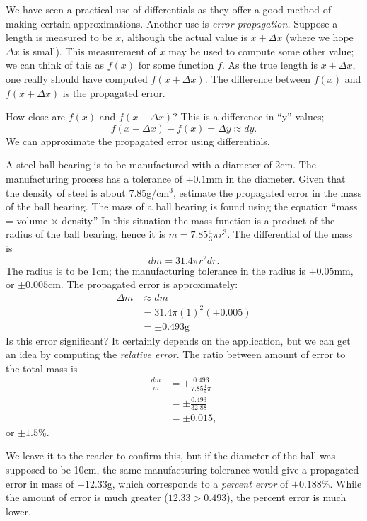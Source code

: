 We have seen a practical use of differentials as they offer a good method of making certain approximations. Another use is \textit{error propagation.} Suppose a length is measured to be $x$, although the actual value is $x+\Delta x$ (where we hope $\Delta x$ is small). This measurement of $x$ may be used to compute some other value; we can think of this as $f(x)$ for some function $f$. As the true length is $x+\Delta x$, one really should have computed $f(x+\Delta x)$. The difference between $f(x)$ and $f(x+\Delta x)$ is the propagated error. 

How close are $f(x)$ and $f(x+\Delta x)$? This is a difference in ``y'' values;
\[f(x+\Delta x)-f(x) = \Delta y \approx dy.\]
We can approximate the propagated error using differentials.

\begin{example}\label{ex_diffal4}
A steel ball bearing is to be manufactured with a diameter of 2cm. The manufacturing process has a tolerance of $\pm 0.1$mm in the diameter. Given that the density of steel is about 7.85g/cm$^3$, estimate the propagated error in the mass of the ball bearing.
\solution
The mass of a ball bearing is found using the equation ``mass = volume $\times$ density.'' In this situation the mass function is a product of the radius of the ball bearing, hence it is $m = 7.85\frac43\pi r^3$. The differential of the mass is
\[dm = 31.4\pi r^2 dr.\]
The radius is to be 1cm; the manufacturing tolerance in the radius is $\pm 0.05$mm, or $\pm 0.005$cm. The propagated error is approximately:
\begin{align*}
\Delta m & \approx dm \\
				&= 31.4\pi (1)^2 (\pm 0.005) \\
				&= \pm 0.493\text{g}
\end{align*}
Is this error significant? It certainly depends on the application, but we can get an idea by computing the \textit{relative error}. The ratio between amount of error to the total mass is
\begin{align*}
\frac{dm}{m} &= \pm \frac{0.493}{7.85\frac43\pi} \\
							&=\pm \frac{0.493}{32.88}\\
							&=\pm 0.015,
\end{align*}
or $\pm 1.5$\%. 

We leave it to the reader to confirm this, but if the diameter of the ball was supposed to be 10cm, the same manufacturing tolerance would give a propagated error in mass of $\pm12.33$g, which corresponds to a \textit{percent error} of $\pm0.188$\%. While the amount of error is much greater ($12.33 > 0.493$), the percent error is much lower.
\end{example}


